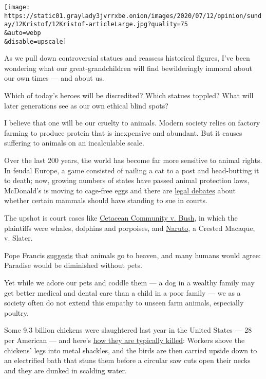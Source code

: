 \texttt{[image: https://static01.graylady3jvrrxbe.onion/images/2020/07/12/opinion/sunday/12Kristof/12Kristof-articleLarge.jpg?quality=75\\\&auto=webp\\\&disable=upscale]}

As we pull down controversial statues and reassess historical figures,
I've been wondering what our great-grandchildren will find bewilderingly
immoral about our own times --- and about us.

Which of today's heroes will be discredited? Which statues toppled? What
will later generations see as our own ethical blind spots?

I believe that one will be our cruelty to animals. Modern society relies
on factory farming to produce protein that is inexpensive and abundant.
But it causes suffering to animals on an incalculable scale.

Over the last 200 years, the world has become far more sensitive to
animal rights. In feudal Europe, a game consisted of nailing a cat to a
post and head-butting it to death; now, growing numbers of states have
passed animal protection laws, McDonald's is moving to cage-free eggs
and there are
\href{https://fedsoc.org/commentary/fedsoc-blog/do-animals-or-humans-claiming-to-represent-them-have-constitutional-standing-to-file-federal-lawsuits-in-the-ninth-circuit-the-answer-is-yes\#:~:text=In\%20the\%20Ninth\%20Circuit\%2C\%20the\%20Answer\%20Is\%20Yes.,-Topics\%3A\&text=You\%20might\%20be\%20a\%20little,file\%20lawsuits\%20in\%20federal\%20cases.}{legal
debates} about whether certain mammals should have standing to sue in
courts.

The upshot is court cases like
\href{https://www.animallaw.info/case/cetacean-community-v-bush}{Cetacean
Community v. Bush}, in which the plaintiffs were whales, dolphins and
porpoises, and
\href{https://www.animallaw.info/pleading/naruto-v-slater-peta}{Naruto},
a Crested Macaque, v. Slater.

Pope Francis
\href{https://www.nytimes3xbfgragh.onion/2015/09/24/opinion/nicholas-kristof-a-pope-for-all-species.html}{suggests}
that animals go to heaven, and many humans would agree: Paradise would
be diminished without pets.

Yet while we adore our pets and coddle them --- a dog in a wealthy
family may get better medical and dental care than a child in a poor
family --- we as a society often do not extend this empathy to unseen
farm animals, especially poultry.

Some 9.3 billion chickens were slaughtered last year in the United
States --- 28 per American --- and here's
\href{https://www.nytimes3xbfgragh.onion/2015/03/15/opinion/sunday/nicholas-kristof-to-kill-a-chicken.html}{how
they are typically killed}: Workers shove the chickens' legs into metal
shackles, and the birds are then carried upside down to an electrified
bath that stuns them before a circular saw cuts open their necks and
they are dunked in scalding water.

